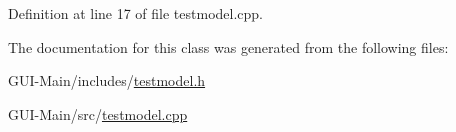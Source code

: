 Definition at line 17 of file testmodel.\+cpp.



The documentation for this class was generated from the following files\+:\begin{DoxyCompactItemize}
\item 
G\+U\+I-\/\+Main/includes/\hyperlink{testmodel_8h}{testmodel.\+h}\item 
G\+U\+I-\/\+Main/src/\hyperlink{testmodel_8cpp}{testmodel.\+cpp}\end{DoxyCompactItemize}
